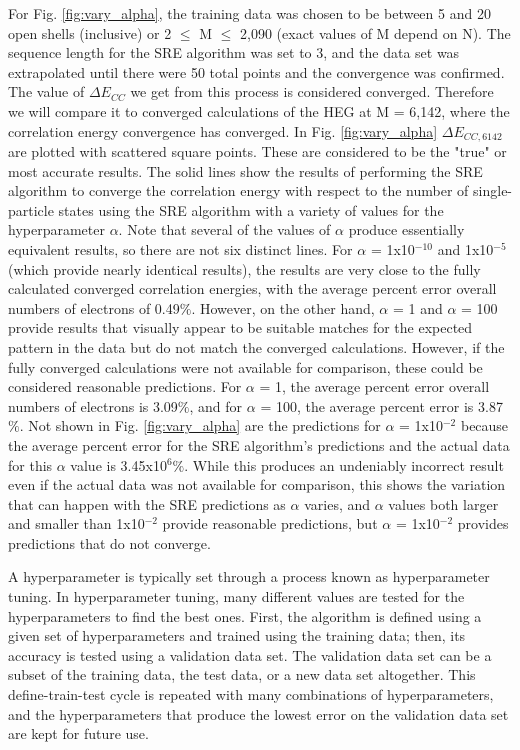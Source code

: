 For Fig. \ref{fig:vary_alpha}, the training data was chosen to be between 5 and 20 open shells (inclusive) or 2 $\leq$ M $\leq$ 2,090 (exact values of M depend on N). The sequence length for the SRE algorithm was set to 3, and the data set was extrapolated until there were 50 total points and the convergence was confirmed. The value of $\Delta E_{CC}$ we get from this process is considered converged. Therefore we will compare it to converged calculations of the HEG at M = 6,142, where the correlation energy convergence has converged. In Fig. \ref{fig:vary_alpha} $\Delta E_{CC, 6142}$ are plotted with scattered square points. These are considered to be the "true" or most accurate results. The solid lines show the results of performing the SRE algorithm to converge the correlation energy with respect to the number of single-particle states using the SRE algorithm with a variety of values for the hyperparameter $\alpha$.   Note that several of the values of $\alpha$ produce essentially equivalent results, so there are not six distinct lines. For $\alpha$ = 1x10$^{-10}$ and 1x10$^{-5}$ (which provide nearly identical results), the results are very close to the fully calculated converged correlation energies, with the average percent error overall numbers of electrons of 0.49$\%$. However, on the other hand, $\alpha$ = 1 and $\alpha$ = 100 provide results that visually appear to be suitable matches for the expected pattern in the data but do not match the converged calculations. However, if the fully converged calculations were not available for comparison, these could be considered reasonable predictions. For $\alpha$ = 1, the average percent error overall numbers of electrons is 3.09$\%$, and for $\alpha$ = 100, the average percent error is 3.87$\%$. Not shown in Fig. \ref{fig:vary_alpha} are the predictions for $\alpha$ = 1x10$^{-2}$ because the average percent error for the SRE algorithm's predictions and the actual data for this $\alpha$ value is 3.45x10$^{6}$$\%$. While this produces an undeniably incorrect result even if the actual data was not available for comparison, this shows the variation that can happen with the SRE predictions as $\alpha$ varies, and $\alpha$ values both larger and smaller than 1x10$^{-2}$ provide reasonable predictions, but $\alpha$ = 1x10$^{-2}$ provides predictions that do not converge.

A hyperparameter is typically set through a process known as hyperparameter tuning. In hyperparameter tuning, many different values are tested for the hyperparameters to find the best ones. First, the algorithm is defined using a given set of hyperparameters and trained using the training data; then, its accuracy is tested using a validation data set. The validation data set can be a subset of the training data, the test data, or a new data set altogether. This define-train-test cycle is repeated with many combinations of hyperparameters, and the hyperparameters that produce the lowest error on the validation data set are kept for future use.


